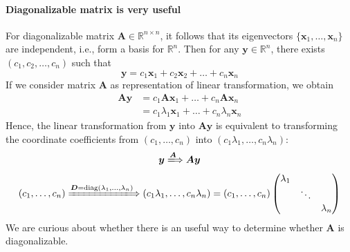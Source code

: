 \paragraph{Diagonalizable matrix is very useful}
For diagonalizable matrix $\bm A\in\mathbb{R}^{n\times n}$, it follows that its eigenvectors $\{\bm x_1,\dots,\bm x_n\}$ are independent, i.e., form a basis for $\mathbb{R}^{n}$. Then for any $\bm y\in\mathbb{R}^{n}$,  there exists $(c_1,c_2,\dots,c_n)$ such that
\[
\bm y=c_1\bm x_1+c_2\bm x_2+\dots+c_n\bm x_n
\]
If we consider matrix $\bm A$ as representation of linear transformation, we obtain
\begin{align*}
\bm{Ay}&=c_1\bm A\bm x_1+\dots+c_n\bm A\bm x_n\\
&=c_1\lambda_1\bm x_1+\dots+c_n\lambda_n\bm x_n
\end{align*}
Hence, the linear transformation from $\bm y$ into $\bm{Ay}$ is equivalent to transforming the coordinate coefficients from $(c_1,\dots,c_n)$ into $(c_1\lambda_1,\dots,c_n\lambda_n)$:
\begin{gather*}
\bm y\xLongrightarrow{\bm A}\bm{Ay}
\\
(c_1,\dots,c_n)\xLongrightarrow{\bm D=\diag(\lambda_1,\dots,\lambda_n)}
(c_1\lambda_1,\dots,c_n\lambda_n)=(c_1,\dots,c_n)\begin{pmatrix}
\lambda_1&&\\&\ddots&\\&&\lambda_n
\end{pmatrix}
\end{gather*}
We are curious about whether there is an useful way to determine whether $\bm A$ is diagonalizable.

